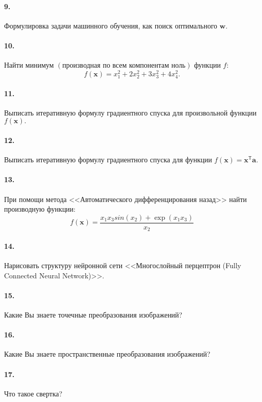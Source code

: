 \documentclass[12pt, twoside]{article}
\begin{document}
\paragraph{9.} Формулировка задачи машинного обучения, как поиск оптимального $\textbf{w}$.

\paragraph{10.} Найти минимум $\left(\text{производная по всем компонентам ноль}\right)$ функции $f$:
$$f\left(\textbf{x}\right) = x_1^2 + 2x_2^2+3x_3^2+4x_4^2.$$

\paragraph{11.} Выписать итеративную формулу градиентного спуска для произвольной функции $f\left(\textbf{x}\right).$

\paragraph{12.} Выписать итеративную формулу градиентного спуска для функции $f\left(\textbf{x}\right) = \textbf{x}^{\mathsf{T}}\textbf{a}.$

\paragraph{13.} При помощи метода <<Автоматического дифференцирования назад>> найти производную функции:
$$f\left(\textbf{x}\right) = \frac{x_1x_3sin\left(x_2\right) + \exp\left(x_1x_3\right)}{x_2}$$

\paragraph{14.} Нарисовать структуру нейронной сети <<Многослойный перцептрон (Fully Connected Neural Network)>>.

\paragraph{15.} Какие Вы знаете точечные преобразования изображений?

\paragraph{16.} Какие Вы знаете пространственные преобразования изображений?

\paragraph{17.} Что такое свертка?
\end{document}
